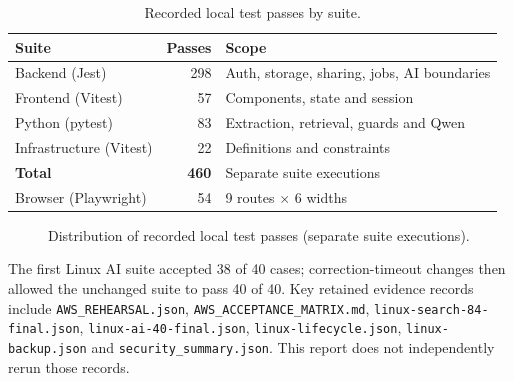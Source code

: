 \begin{table}[htbp]
\centering
\begin{tabularx}{\textwidth}{@{}p{4.2cm}rL@{}}
\toprule
\textbf{Suite} & \textbf{Passes} & \textbf{Scope}\\
\midrule
Backend (Jest) & 298 & Auth, storage, sharing, jobs, AI boundaries\\
Frontend (Vitest) & 57 & Components, state and session\\
Python (pytest) & 83 & Extraction, retrieval, guards and Qwen\\
Infrastructure (Vitest) & 22 & Definitions and constraints\\
\midrule
\textbf{Total} & \textbf{460} & Separate suite executions\\
\midrule
Browser (Playwright) & 54 & 9 routes $\times$ 6 widths\\
\bottomrule
\end{tabularx}
\caption{Recorded local test passes by suite.}
\label{tab:suites}
\end{table}

\begin{figure}[htbp]
\centering
{}
\caption{Distribution of recorded local test passes (separate suite executions).}
\label{fig:suites}
\end{figure}

The first Linux AI suite accepted 38 of 40 cases; correction-timeout changes then allowed the unchanged suite to pass 40 of 40. Key retained evidence records include \nolinkurl{AWS_REHEARSAL.json}, \nolinkurl{AWS_ACCEPTANCE_MATRIX.md}, \nolinkurl{linux-search-84-final.json}, \nolinkurl{linux-ai-40-final.json}, \nolinkurl{linux-lifecycle.json}, \nolinkurl{linux-backup.json} and \nolinkurl{security_summary.json}. This report does not independently rerun those records.

